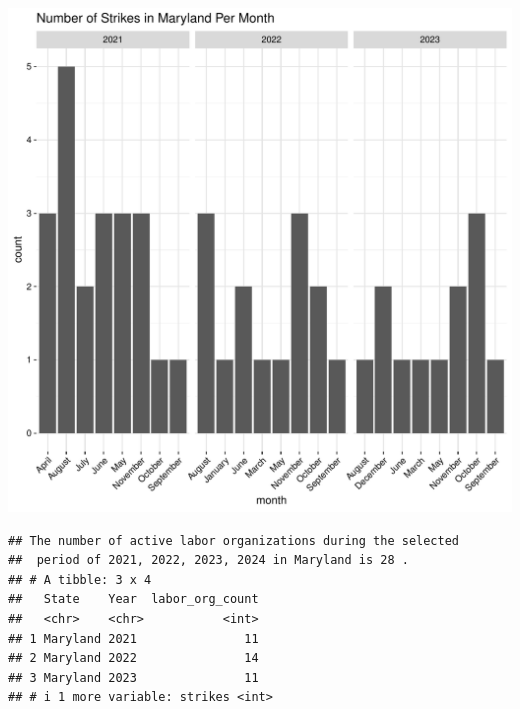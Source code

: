 \documentclass[11pt]{article}\usepackage[]{graphicx}\usepackage[]{xcolor}
\makeatletter
\newenvironment{kframe}{%
 \def\at@end@of@kframe{}%
 \ifinner\ifhmode%
  \def\at@end@of@kframe{\end{minipage}}%
  \begin{minipage}{\columnwidth}%
 \fi\fi%
 \def\FrameCommand##1{\hskip\@totalleftmargin \hskip-\fboxsep
 \colorbox{shadecolor}{##1}\hskip-\fboxsep
     \hskip-\linewidth \hskip-\@totalleftmargin \hskip\columnwidth}%
 \MakeFramed {\advance\hsize-\width
   \@totalleftmargin\z@ \linewidth\hsize
   \@setminipage}}%
 {\par\unskip\endMakeFramed%
 \at@end@of@kframe}
\newenvironment{knitrout}{}{} %
\makeatother
\begin{document}
\begin{knitrout}
\color{fgcolor}

{\centering \includegraphics[width=0.7\linewidth]{figure/calling_the_ggplots_for_Maryland-1} 

}


\begin{kframe}\begin{verbatim}
## The number of active labor organizations during the selected 
##  period of 2021, 2022, 2023, 2024 in Maryland is 28 .
## # A tibble: 3 x 4
##   State    Year  labor_org_count
##   <chr>    <chr>           <int>
## 1 Maryland 2021               11
## 2 Maryland 2022               14
## 3 Maryland 2023               11
## # i 1 more variable: strikes <int>
\end{verbatim}
\end{kframe}
\end{knitrout}
\end{document}
